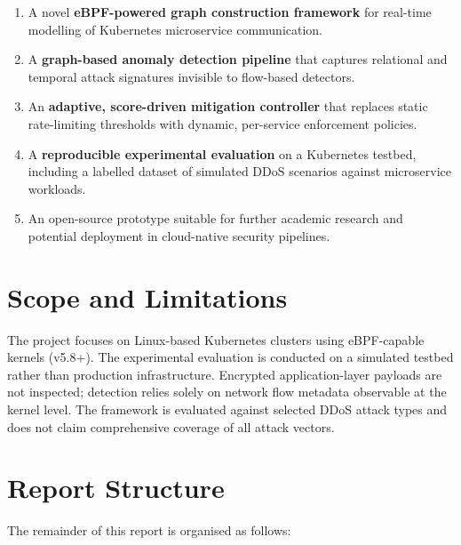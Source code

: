 \begin{enumerate}
  \item A novel \textbf{eBPF-powered graph construction framework} for real-time
  modelling of Kubernetes microservice communication.

  \item A \textbf{graph-based anomaly detection pipeline} that captures relational and
  temporal attack signatures invisible to flow-based detectors.

  \item An \textbf{adaptive, score-driven mitigation controller} that replaces static
  rate-limiting thresholds with dynamic, per-service enforcement policies.

  \item A \textbf{reproducible experimental evaluation} on a Kubernetes testbed,
  including a labelled dataset of simulated DDoS scenarios against microservice workloads.

  \item An open-source prototype suitable for further academic research and potential
  deployment in cloud-native security pipelines.
\end{enumerate}

\section{Scope and Limitations}
\label{sec:scope}

The project focuses on Linux-based Kubernetes clusters using eBPF-capable kernels
(v5.8+). The experimental evaluation is conducted on a simulated testbed rather than
production infrastructure. Encrypted application-layer payloads are not inspected;
detection relies solely on network flow metadata observable at the kernel level. The
framework is evaluated against selected DDoS attack types and does not claim comprehensive
coverage of all attack vectors.

\section{Report Structure}
\label{sec:structure}

The remainder of this report is organised as follows:

